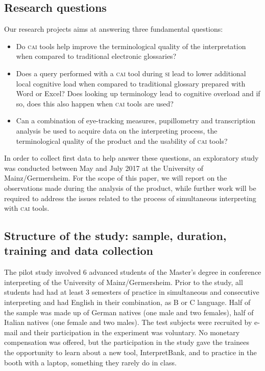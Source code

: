 \documentclass[output=paper]{langsci/langscibook}
\begin{document}
\subsection{Research questions}\label{sec:prandi:3.2}
Our research projects aims at answering three fundamental questions:

\begin{itemize}
\item Do \textsc{cai} tools help improve the terminological quality of the interpretation when compared to traditional electronic glossaries?
\item Does a query performed with a \textsc{cai} tool during \textsc{si} lead to lower additional local cognitive load when compared to traditional glossary prepared with Word or Excel? Does looking up terminology lead to cognitive overload and if so, does this also happen when \textsc{cai} tools are used?
\item Can a combination of eye-tracking measures, pupillometry and transcription analysis be used to acquire data on the interpreting process, the terminological quality of the product and the usability of \textsc{cai} tools?
\end{itemize}

In order to collect first data to help answer these questions, an exploratory study was conducted between May and July 2017 at the University of Mainz\slash Germersheim. For the scope of this paper, we will report on the observations made during the analysis of the product, while further work will be required to address the issues related to the process of simultaneous interpreting with \textsc{cai} tools.

\subsection{Structure of the study: sample, duration, training and data collection}\label{sec:prandi:3.3}
The pilot study involved 6 advanced students of the Master’s degree in conference interpreting of the University of Mainz\slash Germersheim. Prior to the study, all students had had at least 3 semesters of practice in simultaneous and consecutive interpreting and had English in their combination, as B or C language. Half of the sample was made up of German natives (one male and two females), half of Italian natives (one female and two males). The test subjects were recruited by e-mail and their participation in the experiment was voluntary. No monetary compensation was offered, but the participation in the study gave the trainees the opportunity to learn about a new tool, InterpretBank, and to practice in the booth with a laptop, something they rarely do in class.
\end{document}
